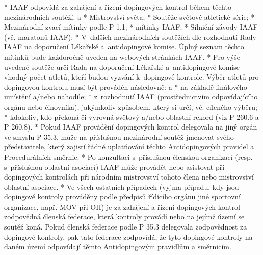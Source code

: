 * IAAF odpovídá za zahájení a řízení dopingových kontrol během těchto mezinárodních soutěží:
  \begitems \style a
  * Mistrovství světa;
  * Soutěže světové atletické série;
  * Mezinárodní zvací mítinky podle P 1.1;
  * mítinky IAAF;
  * Silniční závody IAAF (vč. maratonů IAAF);
  * V~dalších mezinárodních soutěžích dle rozhodnutí Rady IAAF na doporučení Lékařské a~antidopingové komise. Úplný seznam těchto mítinků bude každoročně uveden na webových stránkách IAAF.
  \enditems
* Pro výše uvedené soutěže určí Rada na doporučení Lékařské a~antidopingové komise vhodný počet atletů, kteří budou vyzvání k~dopingové kontrole. Výběr atletů pro dopingovou kontrolu musí být prováděn následovně:
  \begitems \style a
  * na základě finálového umístění a/nebo nahodile;
  * z~rozhodnutí IAAF (prostřednictvím odpovídajícího orgánu nebo činovníka), jakýmkoliv způsobem, který si určí, vč. cíleného výběru;
  * kdokoliv, kdo překoná či vyrovná světový a/nebo oblastní rekord (viz P 260.6 a P 260.8).
  \enditems
* Pokud IAAF provádění dopingových kontrol delegovala na jiný orgán ve smyslu P 35.3, může na příslušnou mezinárodní soutěž jmenovat svého představitele, který zajistí řádné uplatňování těchto Antidopingových pravidel a Procedurálních směrnic.
* Po konzultaci s~příslušnou členskou organizací (resp. s~příslušnou oblastní asociací) IAAF může provádět nebo asistovat při dopingových kontrolách při národním mistrovství tohoto člena nebo mistrovství oblastní asociace.
* Ve všech ostatních případech (vyjma případu, kdy jsou dopingové kontroly prováděny podle předpisů řídícího orgánu jiné sportovní organizace, např. MOV při OH) je za zahájení a řízení dopingových kontrol zodpovědná členská federace, která kontroly provádí nebo na jejímž území se soutěž koná. Pokud členská federace podle P 35.3 delegovala zodpovědnost za dopingové kontroly, pak tato federace zodpovídá, že tyto dopingové kontroly na daném území odpovídají těmto Antidopingovým pravidlům a směrnicím.

